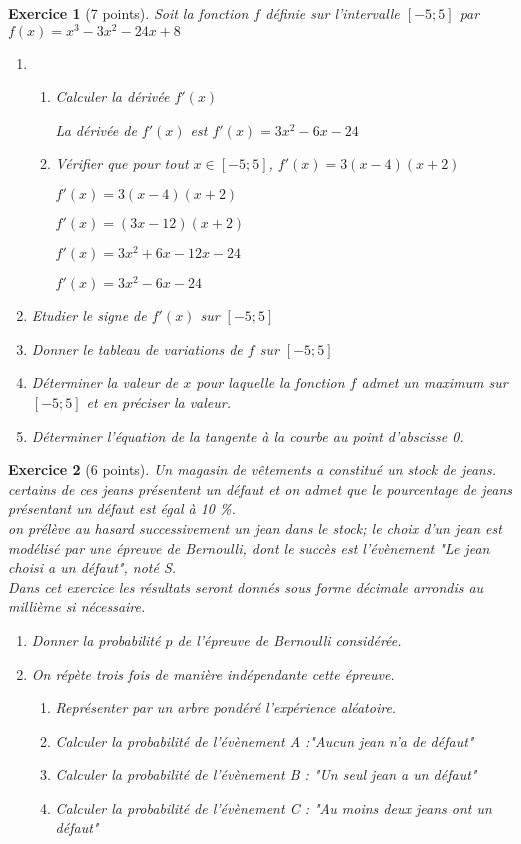 \documentclass[11pt,a4paper]{article}
\theoremstyle{break}
\newtheorem{exo}{Exercice}
\begin{document}
\begin{exo}[7 points]
	Soit la fonction $f$ définie sur l'intervalle $[ -5 ; 5 ]$ par $f(x)=x^3-3x^2-24x+8$
	\begin{enumerate}
		\item 
		\begin{enumerate}
			\item Calculer la dérivée $f'(x)$\par
			La dérivée de $f'(x)$ est $f'(x) = 3x^2 - 6x - 24$
			
			\item Vérifier que pour tout $x \in [ -5 ; 5]$, $ f'(x)= 3 (x-4)(x+2)$\par
			$f'(x)= 3 (x-4)(x+2)$\par
			$f'(x)= (3x-12)(x+2)$\par
			$f'(x)= 3x^2+6x-12x-24$\par
			$f'(x)= 3x^2-6x-24$\par
		\end{enumerate}
		\item Etudier le signe de $f '(x )$ sur $[ -5 ; 5 ]$
		 
		 \item Donner le tableau de variations de $f$ sur $[ -5 ; 5 ]$
		 \item Déterminer la valeur de $x$ pour laquelle la fonction $f$ admet un maximum sur $[ -5 ; 5 ]$ et en préciser la valeur.
		 \item  Déterminer l'équation de la tangente à la courbe au point d'abscisse 0.
	
	\end{enumerate}
\end{exo}
\begin{exo}[6 points]
	Un magasin de vêtements a constitué un stock de jeans. certains de ces jeans présentent un défaut et on admet que le pourcentage de jeans présentant un défaut est égal à 10 \%.\\
	on prélève au hasard successivement un jean dans le stock; le choix d'un jean est modélisé par une épreuve de Bernoulli, dont le succès est l'évènement "Le jean choisi a un défaut", noté S.\\
	Dans cet exercice les résultats seront donnés sous forme décimale arrondis au millième si nécessaire.
	\begin{enumerate}
		\item Donner la probabilité $p$ de l'épreuve de Bernoulli considérée.
		\item On répète trois fois de manière indépendante cette épreuve.
		\begin{enumerate}
			\item Représenter par un arbre pondéré l'expérience aléatoire.
			\item Calculer la probabilité de l'évènement A :"Aucun jean n'a de défaut"
			\item Calculer la probabilité de l'évènement B : "Un seul jean a un défaut"
			\item Calculer la probabilité de l'évènement C : "Au moins deux jeans ont un défaut"
		\end{enumerate}
	\end{enumerate}
\end{exo}
\end{document}
